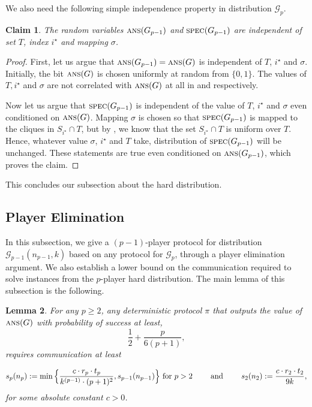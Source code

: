 \documentclass[11pt]{article}
\newtheorem{lemma}{Lemma}[section]
\newtheorem{claim}[lemma]{Claim}
\theoremstyle{definition}
\renewcommand{\geq}{\geqslant}
\newcommand{\cG}{\ensuremath{\mathcal{G}}}
\newcommand{\ans}{\ensuremath{\textnormal{\textsc{ans}}}}
\newcommand{\spec}{\ensuremath{\textnormal{\textsc{spec}}}}
\newcommand{\istar}{\ensuremath{i^{\star}}}
\newcommand{\prot}{\ensuremath{\pi}}
\begin{document}
	We also need the following simple independence property in distribution $\cG_p$. 
	

	\begin{claim}\label{clm:ind-prop-3}
		The random variables $\ans(G_{p-1})$ and $\spec(G_{p-1})$ are independent of set $T$, index $\istar$ and mapping $\sigma$. 
	\end{claim}
	\begin{proof}
		First, let us argue that $\ans(G_{p-1}) = \ans(G)$ is independent of $T$, $\istar$ and $\sigma$. Initially, the bit $\ans(G)$ is chosen uniformly at random from $\{0,1\}$. The values of $T, \istar$ and $\sigma$ are not correlated with $\ans(G)$ at all in  and  respectively. 
		
	Now let us argue that $\spec(G_{p-1})$ is independent of the value of $T$, $\istar$ and $\sigma$ even conditioned on $\ans(G)$. 
		Mapping $\sigma$ is chosen so that $\spec(G_{p-1})$ is mapped to the cliques in $S_{\istar} \cap T$, but by , we know that the set $S_{\istar} \cap T$ is uniform over $T$. 
		Hence, whatever value $\sigma$, $\istar$ and $T$ take, distribution of $\spec(G_{p-1})$ will be unchanged. 
		These statements are true even conditioned on $\ans(G_{p-1})$, which proves the claim.
	\end{proof}

This concludes our subsection about the hard distribution.
	
	\subsection{Player Elimination}\label{subsec:player-elim}
	
	In this subsection, we give a $(p-1)$-player protocol for distribution $\cG_{p-1}(n_{p-1}, k)$ based on any protocol for $\cG_p$, through a player elimination argument. We also establish a lower bound on the communication required to solve  instances from the $p$-player hard distribution.
	The main lemma of this subsection is the following. 

	\begin{lemma}\label{lem:inductive-hardness-Gp}
		For any $p \geq 2$, any deterministic protocol $\prot$ that outputs the value of $\ans(G)$ with probability of success at least, 
		\[
		\frac12 + \frac{p}{6 (p+1)},
		\]
		requires communication at least 
		
		\begin{equation*}
		s_p(n_p) := \min\Big\{\frac{c \cdot r_p \cdot t_p}{k^{(p-1)} \cdot (p+1)^2}, s_{p-1}(n_{p-1})\Big\} \textnormal{ for $p > 2$} \qquad \textnormal{ and }\qquad s_2(n_2) := \frac{c \cdot r_2 \cdot t_2}{9k},
		\end{equation*}
		for some absolute constant $c > 0$.
	\end{lemma}
\end{document}
